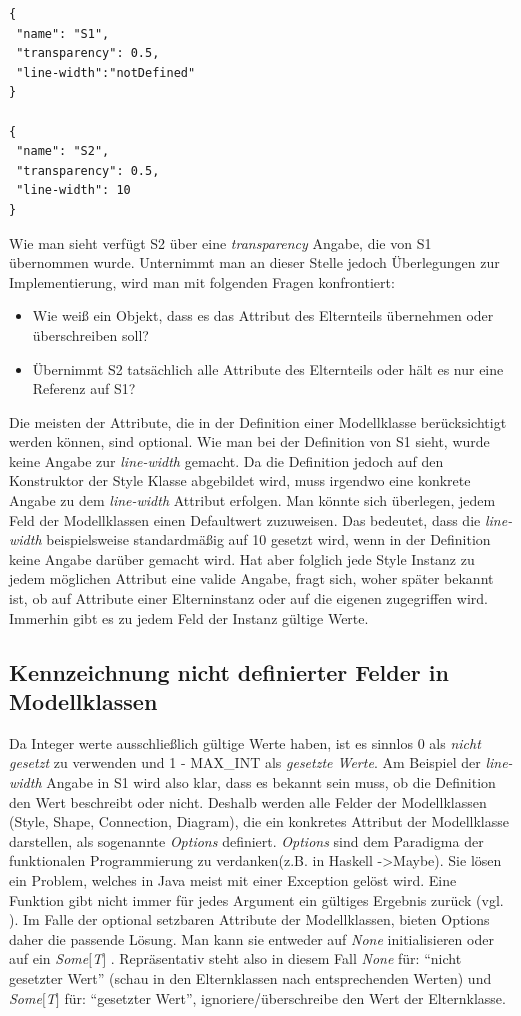 \begin{lstlisting}[style=spray]
{
 "name": "S1",
 "transparency": 0.5,
 "line-width":"notDefined"
}

{
 "name": "S2",
 "transparency": 0.5,
 "line-width": 10
}
\end{lstlisting}Wie man sieht verfügt S2 über eine \textit{transparency} Angabe, die von S1 übernommen wurde. Unternimmt man an dieser Stelle jedoch Überlegungen zur Implementierung, wird man mit folgenden Fragen konfrontiert:
\begin{itemize}
\item Wie weiß ein Objekt, dass es das Attribut des Elternteils übernehmen oder überschreiben soll?
\item Übernimmt S2 tatsächlich alle Attribute des Elternteils oder hält es nur eine Referenz auf S1?
\end{itemize}Die meisten der Attribute, die in der Definition einer Modellklasse berücksichtigt werden können, sind optional. Wie man bei der Definition von S1 sieht, wurde keine Angabe zur \textit{line-width} gemacht. Da die Definition jedoch auf den Konstruktor der Style Klasse abgebildet wird, muss irgendwo eine konkrete Angabe zu dem \textit{line-width} Attribut erfolgen. Man könnte sich überlegen, jedem Feld der Modellklassen einen Defaultwert zuzuweisen. Das bedeutet, dass die \textit{line-width} beispielsweise standardmäßig auf 10 gesetzt wird, wenn in der Definition keine Angabe darüber gemacht wird. Hat aber folglich jede Style Instanz zu jedem möglichen Attribut eine valide Angabe, fragt sich, woher später bekannt ist, ob auf Attribute einer Elterninstanz oder auf die eigenen zugegriffen wird. Immerhin gibt es zu jedem Feld der Instanz gültige Werte.
\subsection{Kennzeichnung nicht definierter Felder in Modellklassen}
Da Integer werte ausschließlich gültige Werte haben, ist es sinnlos 0 als \textit{nicht gesetzt} zu verwenden und 1 - MAX\_INT als \textit{gesetzte Werte}. Am Beispiel der \textit{line-width} Angabe in S1 wird also klar, dass es bekannt sein muss, ob die Definition den Wert beschreibt oder nicht. 
Deshalb werden alle Felder der Modellklassen (Style, Shape, Connection, Diagram), die ein konkretes Attribut der Modellklasse darstellen, als sogenannte \textit{Options} definiert. \textit{Options} sind dem Paradigma der funktionalen Programmierung zu verdanken(z.B. in Haskell -\textgreater Maybe).
Sie lösen ein Problem, welches in Java meist mit einer Exception gelöst wird.
Eine Funktion gibt nicht immer für jedes Argument ein gültiges Ergebnis zurück (vgl. \citet[p. 102]{esser:scala}). Im Falle der optional setzbaren Attribute der Modellklassen, bieten Options daher die passende Lösung. Man kann sie entweder auf \textit{None} initialisieren oder auf ein \textit{Some$[$T$]$ }. Repräsentativ steht also in diesem Fall \textit{None} für: "`nicht gesetzter Wert"' (schau in den Elternklassen nach entsprechenden Werten) und \textit{Some$[$T$]$} für: "`gesetzter Wert"', ignoriere/überschreibe den Wert der Elternklasse.
